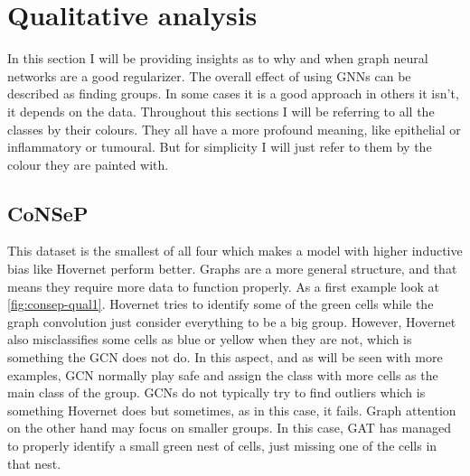 \section{Qualitative analysis}

In this section I will be providing insights as to why and when graph neural networks are a good regularizer. The overall effect of using GNNs can be described as finding groups. In some cases it is a good approach in others it isn't, it depends on the data. Throughout this sections I will be referring to all the classes by their colours. They all have a more profound meaning, like epithelial or inflammatory or tumoural. But for simplicity I will just refer to them by the colour they are painted with.

\subsection{CoNSeP}

This dataset is the smallest of all four which makes a model with higher inductive bias like Hovernet perform better. Graphs are a more general structure, and that means they require more data to function properly. As a first example look at \autoref{fig:consep-qual1}. Hovernet tries to identify some of the green cells while the graph convolution just consider everything to be a big group. However, Hovernet also misclassifies some cells as blue or yellow when they are not, which is something the GCN does not do. In this aspect, and as will be seen with more examples, GCN normally play safe and assign the class with more cells as the main class of the group. GCNs do not typically try to find outliers which is something Hovernet does but sometimes, as in this case, it fails. Graph attention on the other hand may focus on smaller groups. In this case, GAT has managed to properly identify a small green nest of cells, just missing one of the cells in that nest. 

